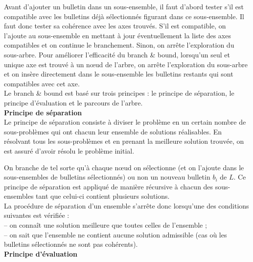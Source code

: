 \documentclass[11pt, a4paper]{article}
\begin{document}
Avant d'ajouter un bulletin dans un sous-ensemble, il faut d'abord tester s'il est compatible avec les bulletins d\'{e}j\`{a} s\'{e}lectionn\'{e}s figurant dans ce sous-ensemble. Il faut donc tester sa coh\'{e}rence avec les axes trouv\'{e}s. S'il est compatible, on l'ajoute au sous-ensemble en mettant à jour éventuellement la liste des axes compatibles et on continue le branchement. Sinon, on arr\^{e}te l'exploration du sous-arbre. Pour am\'{e}liorer l'efficacit\'{e} du branch \& bound, lorsqu'un seul et unique axe est trouv\'{e} \`{a} un n\oe ud de l'arbre, on arr\^{e}te l'exploration du sous-arbre et on ins\`{e}re directement dans le sous-ensemble les bulletins restants qui sont compatibles avec cet axe.\\

Le branch \& bound est bas\'{e} sur trois principes : le principe de s\'{e}paration, le principe d'\'{e}valuation et le parcours de l'arbre.\\

\noindent \textbf{Principe de s\'{e}paration}\\

Le principe de s\'{e}paration consiste \`{a} diviser le probl\`{e}me en un certain nombre de sous-probl\`{e}mes qui ont chacun leur ensemble de solutions r\'{e}alisables. En r\'{e}solvant tous les sous-probl\`{e}mes et en prenant la meilleure solution trouv\'{e}e, on est assur\'{e} d'avoir r\'{e}solu le probl\`{e}me initial.

On branche de tel sorte qu'à chaque nœud on sélectionne (et on l'ajoute dans le sous-ensembles de bulletins sélectionnés) ou non un nouveau bulletin $b_{i}$ de $L$. Ce principe de s\'{e}paration est appliqu\'{e} de mani\`{e}re r\'{e}cursive \`{a} chacun des sous-ensembles tant que celui-ci contient plusieurs solutions. \\

\noindent La proc\'{e}dure de s\'{e}paration d'un ensemble s'arr\^{e}te donc lorsqu'une des conditions suivantes est v\'{e}rifi\'{e}e : \\
-- on conna\^{i}t une solution meilleure que toutes celles de l'ensemble ;\\
-- on sait que l'ensemble ne contient aucune solution admissible (cas o\`{u} les bulletins s\'{e}lectionn\'{e}s ne sont pas coh\'{e}rents).\\

\noindent \textbf{Principe d'\'{e}valuation}\\
\end{document}
